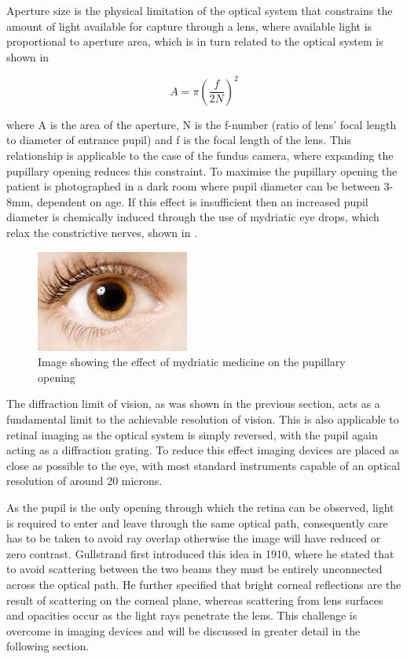 Aperture size is the physical limitation of the optical system that
constrains the amount of light available for capture through a lens,
where available light is proportional to aperture area, which is in
turn related to the optical system is shown in 

\begin{equation}
A = \pi({\frac{f}{2N}})^2
\label{eq:optical_system}
\end{equation}

where A is the area of the aperture, N is the f-number (ratio of lens'
focal length to diameter of entrance pupil) and f is the focal length
of the lens. This relationship is applicable to the case of the fundus
camera, where expanding the pupillary opening reduces this constraint.
To maximise the pupillary opening the patient is photographed in a dark
room where pupil diameter can be between 3-8mm, dependent on age. If this
effect is insufficient then an increased pupil diameter is chemically
induced through the use of mydriatic eye drops, which relax the constrictive
nerves, shown in .

\begin{figure}[htbp]
\centering
\includegraphics{figures/mydriasis}
\caption{Image showing the effect of mydriatic medicine on the pupillary opening}
\label{fig:myd}
   \end{figure}

The diffraction limit of vision, as was shown in the previous section, 
acts as a fundamental limit to the achievable resolution of vision. This is also
applicable to retinal imaging as the optical system is simply reversed, with 
the pupil again acting as a diffraction grating. To reduce this effect imaging
devices are placed as close as possible to the eye, with most standard 
instruments capable of an optical resolution of around 20 microns.

As the pupil is the only opening through which the retina can be
observed, light is required to enter and leave through the same
optical path, consequently care has to be taken to avoid ray overlap
otherwise the image will have reduced or zero contrast. Gullstrand
first introduced this idea in 1910, where he stated that to avoid
scattering between the two beams they must be entirely unconnected
across the optical path. He further specified that bright corneal
reflections are the result of scattering on the corneal plane,
whereas scattering from lens surfaces and opacities occur as the
light rays penetrate the lens. This challenge is overcome in
imaging devices and will be discussed in greater detail in the
following section.

